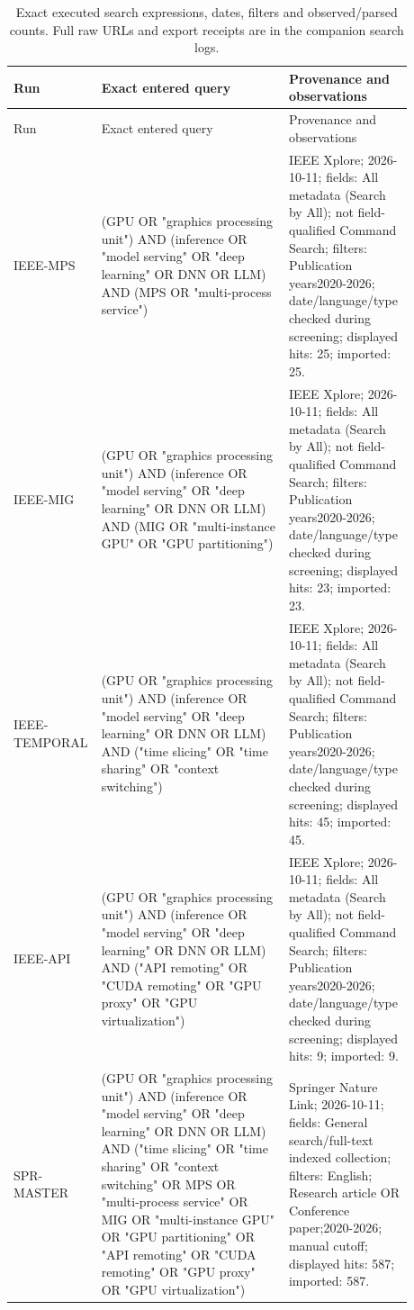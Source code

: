\begin{longtable}{P{0.13\linewidth}P{0.46\linewidth}P{0.29\linewidth}}
\caption{Exact executed search expressions, dates, filters and observed/parsed counts. Full raw URLs and export receipts are in the companion search logs.}\\
\toprule Run & Exact entered query & Provenance and observations\\\midrule\endfirsthead
\toprule Run & Exact entered query & Provenance and observations\\\midrule\endhead
IEEE-MPS & (GPU OR "graphics processing unit") AND (inference OR "model serving" OR "deep learning" OR DNN OR LLM) AND (MPS OR "multi-process service") & IEEE Xplore; 2026-10-11; fields: All metadata (Search by All); not field-qualified Command Search; filters: Publication years2020-2026; date/language/type checked during screening; displayed hits: 25; imported: 25.\\
IEEE-MIG & (GPU OR "graphics processing unit") AND (inference OR "model serving" OR "deep learning" OR DNN OR LLM) AND (MIG OR "multi-instance GPU" OR "GPU partitioning") & IEEE Xplore; 2026-10-11; fields: All metadata (Search by All); not field-qualified Command Search; filters: Publication years2020-2026; date/language/type checked during screening; displayed hits: 23; imported: 23.\\
IEEE-TEMPORAL & (GPU OR "graphics processing unit") AND (inference OR "model serving" OR "deep learning" OR DNN OR LLM) AND ("time slicing" OR "time sharing" OR "context switching") & IEEE Xplore; 2026-10-11; fields: All metadata (Search by All); not field-qualified Command Search; filters: Publication years2020-2026; date/language/type checked during screening; displayed hits: 45; imported: 45.\\
IEEE-API & (GPU OR "graphics processing unit") AND (inference OR "model serving" OR "deep learning" OR DNN OR LLM) AND ("API remoting" OR "CUDA remoting" OR "GPU proxy" OR "GPU virtualization") & IEEE Xplore; 2026-10-11; fields: All metadata (Search by All); not field-qualified Command Search; filters: Publication years2020-2026; date/language/type checked during screening; displayed hits: 9; imported: 9.\\
SPR-MASTER & (GPU OR "graphics processing unit") AND (inference OR "model serving" OR "deep learning" OR DNN OR LLM) AND ("time slicing" OR "time sharing" OR "context switching" OR MPS OR "multi-process service" OR MIG OR "multi-instance GPU" OR "GPU partitioning" OR "API remoting" OR "CUDA remoting" OR "GPU proxy" OR "GPU virtualization") & Springer Nature Link; 2026-10-11; fields: General search/full-text indexed collection; filters: English; Research article OR Conference paper;2020-2026; manual cutoff; displayed hits: 587; imported: 587.\\

\end{longtable}
